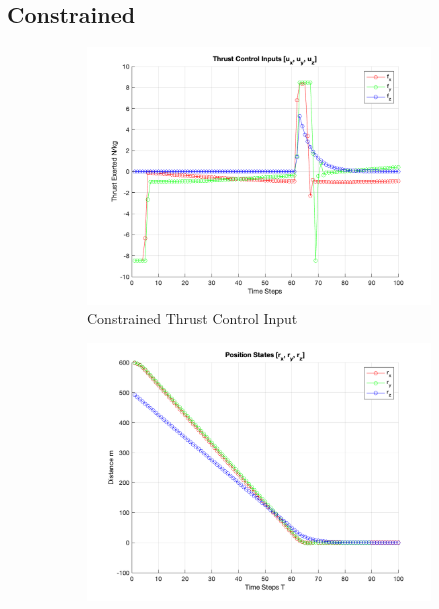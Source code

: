 \documentclass[conference, tikz]{IEEEtran}
\begin{document}
\subsection{Constrained}
\begin{figure}[H]
    \centering
    \begin{subfigure}{\columnwidth}
        \centering
        \includegraphics[width=\columnwidth]{Figures/new/Constrained_input_plot.png}
        \caption{Constrained Thrust Control Input}
        \label{const:control_in}
    \end{subfigure}
    \begin{subfigure}{\columnwidth}
        \centering
        \includegraphics[width=\columnwidth]{Figures/new/Constrained_position_state_plot.png}

\end{subfigure}
\end{figure}
\end{document}
